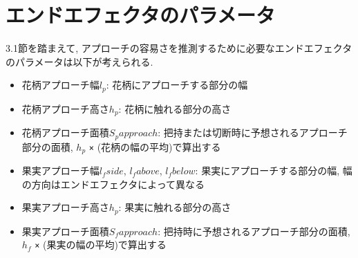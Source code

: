 \section{エンドエフェクタのパラメータ}
3.1節を踏まえて, アプローチの容易さを推測するために必要なエンドエフェクタのパラメータは以下が考えられる.

\begin{itemize}
  \item 花柄アプローチ幅$l_p$: 花柄にアプローチする部分の幅
  \item 花柄アプローチ高さ$h_p$: 花柄に触れる部分の高さ
  \item 花柄アプローチ面積$S_papproach$: 把持または切断時に予想されるアプローチ部分の面積, $h_p$ \verb|×| (花柄の幅の平均)で算出する
  \item 果実アプローチ幅$l_fside$, $l_fabove$, $l_fbelow$: 果実にアプローチする部分の幅, 幅の方向はエンドエフェクタによって異なる
  \item 果実アプローチ高さ$h_p$: 果実に触れる部分の高さ
  \item 果実アプローチ面積$S_fapproach$: 把持時に予想されるアプローチ部分の面積, $h_f$ \verb|×| (果実の幅の平均)で算出する
\end{itemize}